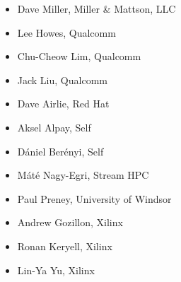 \begin{multicols}{2}
\begin{itemize}
\item
    Dave Miller, Miller \& Mattson, LLC
\item
    Lee Howes, Qualcomm
\item
    Chu-Cheow Lim, Qualcomm
\item
    Jack Liu, Qualcomm
\item
    Dave Airlie, Red Hat
\item
    Aksel Alpay, Self
\item
    D\'{a}niel Ber\'{e}nyi, Self
\item
    M\'{a}t\'{e} Nagy-Egri, Stream HPC
\item
    Paul Preney, University of Windsor
\item
    Andrew Gozillon, Xilinx
\item
    Ronan Keryell, Xilinx
\item
    Lin-Ya Yu, Xilinx
\end{itemize}
\end{multicols}


